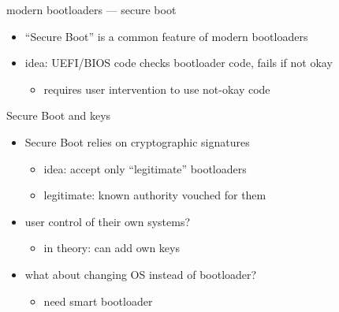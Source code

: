 
\begin{frame}{modern bootloaders --- secure boot}
    \begin{itemize}
    \item ``Secure Boot'' is a common feature of modern bootloaders
    \item idea: UEFI/BIOS code checks bootloader code, fails if not okay
        \begin{itemize}
        \item requires user intervention to use not-okay code
        \end{itemize}
    \end{itemize}
\end{frame}

\begin{frame}{Secure Boot and keys}
    \begin{itemize}
    \item Secure Boot relies on cryptographic signatures
        \begin{itemize}
        \item idea: accept only ``legitimate'' bootloaders
        \item legitimate: known authority vouched for them
        \end{itemize}
    \item user control of their own systems?
        \begin{itemize}
        \item in theory: can add own keys
        \end{itemize}
    \item what about changing OS instead of bootloader?
        \begin{itemize}
        \item need smart bootloader
        \end{itemize}
    \end{itemize}
\end{frame}


